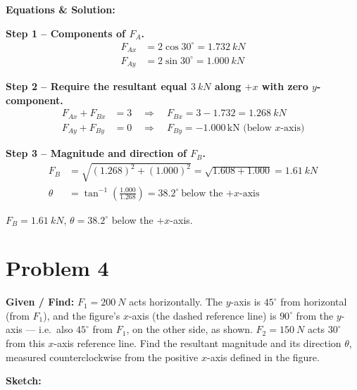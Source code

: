 \documentclass[11pt]{article}
\newcommand{\eqlabel}[1]{\textbf{#1}}
\begin{document}
\textbf{Equations \& Solution:}

\eqlabel{Step 1 -- Components of $F_A$.}
\begin{align*}
    F_{Ax} &= 2\cos 30^\circ = \SI{1.732}{kN} \\
    F_{Ay} &= 2\sin 30^\circ = \SI{1.000}{kN}
\end{align*}

\eqlabel{Step 2 -- Require the resultant equal $\SI{3}{kN}$ along $+x$ with zero $y$-component.}
\begin{align*}
    F_{Ax}+F_{Bx} &= 3 \quad\Rightarrow\quad F_{Bx} = 3-1.732 = \SI{1.268}{kN} \\
    F_{Ay}+F_{By} &= 0 \quad\Rightarrow\quad F_{By} = -1.000\,\text{kN (below $x$-axis)}
\end{align*}

\eqlabel{Step 3 -- Magnitude and direction of $F_B$.}
\begin{align*}
    F_B &= \sqrt{(1.268)^2+(1.000)^2} = \sqrt{1.608+1.000} = \SI{1.61}{kN} \\
    \theta &= \tan^{-1}\!\left(\frac{1.000}{1.268}\right) = 38.2^\circ \ \text{below the $+x$-axis}
\end{align*}

\begin{finalanswer}
    $F_B = \SI{1.61}{kN}$, \quad $\theta = 38.2^\circ$ below the $+x$-axis.
\end{finalanswer}

\clearpage
\section*{Problem 4}

\textbf{Given / Find:} $F_1 = \SI{200}{N}$ acts horizontally. The $y$-axis is $45^\circ$ from horizontal (from $F_1$), and the figure's $x$-axis (the dashed reference line) is $90^\circ$ from the $y$-axis --- i.e.\ also $45^\circ$ from $F_1$, on the other side, as shown. $F_2 = \SI{150}{N}$ acts $30^\circ$ from this $x$-axis reference line. Find the resultant magnitude and its direction $\theta$, measured counterclockwise from the positive $x$-axis defined in the figure.

\textbf{Sketch:}
\begin{center}
\end{center}
\end{document}
